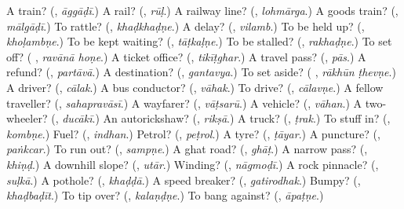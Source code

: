 \begin{tcolorbox}[breakable,colback=teal!4,colframe=teal!35!black,title={Before you move on}]
A train? (\textbf{}, \emph{āggāḍī}.) A rail? (\textbf{}, \emph{rūḷ}.) A railway line? (\textbf{}, \emph{lohmārga}.) A goods train? (\textbf{}, \emph{mālgāḍī}.) To rattle? (\textbf{}, \emph{khaḍkhaḍṇe}.) A delay? (\textbf{}, \emph{vilamb}.) To be held up? (\textbf{}, \emph{khoḷambṇe}.) To be kept waiting? (\textbf{}, \emph{tāṭkaḷṇe}.) To be stalled? (\textbf{}, \emph{rakhaḍṇe}.) To set off? (\textbf{ }, \emph{ravānā hoṇe}.) A ticket office? (\textbf{}, \emph{tikīṭghar}.) A travel pass? (\textbf{}, \emph{pās}.) A refund? (\textbf{}, \emph{partāvā}.) A destination? (\textbf{}, \emph{gantavya}.) To set aside? (\textbf{ }, \emph{rākhūn ṭhevṇe}.) A driver? (\textbf{}, \emph{cālak}.) A bus conductor? (\textbf{}, \emph{vāhak}.) To drive? (\textbf{}, \emph{cālavṇe}.) A fellow traveller? (\textbf{}, \emph{sahapravāsī}.) A wayfarer? (\textbf{}, \emph{vāṭsarū}.) A vehicle? (\textbf{}, \emph{vāhan}.) A two-wheeler? (\textbf{}, \emph{ducākī}.) An autorickshaw? (\textbf{}, \emph{rikṣā}.) A truck? (\textbf{}, \emph{ṭrak}.) To stuff in? (\textbf{}, \emph{kombṇe}.) Fuel? (\textbf{}, \emph{indhan}.) Petrol? (\textbf{}, \emph{peṭrol}.) A tyre? (\textbf{}, \emph{ṭāyar}.) A puncture? (\textbf{}, \emph{paṅkcar}.) To run out? (\textbf{}, \emph{sampṇe}.) A ghat road? (\textbf{}, \emph{ghāṭ}.) A narrow pass? (\textbf{}, \emph{khiṇḍ}.) A downhill slope? (\textbf{}, \emph{utār}.) Winding? (\textbf{}, \emph{nāgmoḍī}.) A rock pinnacle? (\textbf{}, \emph{suḷkā}.) A pothole? (\textbf{}, \emph{khaḍḍā}.) A speed breaker? (\textbf{}, \emph{gatirodhak}.) Bumpy? (\textbf{}, \emph{khaḍbaḍīt}.) To tip over? (\textbf{}, \emph{kalaṇḍṇe}.) To bang against? (\textbf{}, \emph{āpaṭṇe}.)
\end{tcolorbox}
